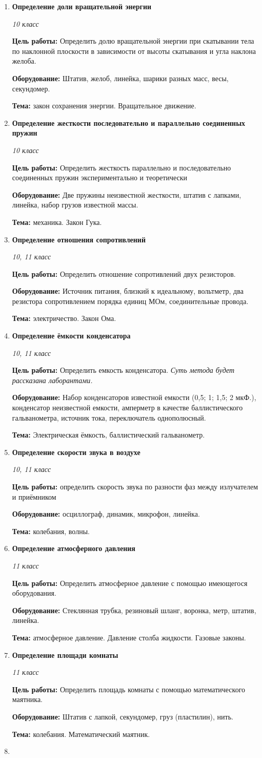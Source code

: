 \documentclass[a4paper,10pt]{article}
\newcommand{\labtitle}[5]{
	\textbf{#2}\par
	\textit{#1 класс}\par
	\textbf{Цель работы:} #3\par
	\textbf{Оборудование:} #4\par
	\textbf{Тема:} #5
}
\begin{document}
\begin{enumerate}
		{10}
		{Определение модуля Юнга}
		{Определить модуль Юнга резинового жгута при деформации растяжения.}
		{Резиновый жгут, миллиметровая бумага, линейка, набор грузов известной массы, штатив.}
		{закон Гука. Модуль Юнга.}
	\item \labtitle
		{10}
		{Определение доли вращательной энергии}
		{Определить долю вращательной энергии при скатывании тела по наклонной плоскости в зависимости от высоты скатывания и угла наклона желоба.}
		{Штатив, желоб, линейка, шарики разных масс, весы, секундомер.}
		{закон сохранения энергии. Вращательное движение.}
	\item \labtitle
		{10}
		{Определение жесткости последовательно и параллельно соединенных пружин}
		{Определить жесткость параллельно и последовательно соединенных пружин экспериментально и теоретически}
		{Две пружины неизвестной жесткости, штатив с лапками, линейка, набор грузов известной массы.}
		{механика. Закон Гука.}
	\item \labtitle
		{10, 11}
		{Определение отношения сопротивлений}
		{Определить отношение сопротивлений двух резисторов.}
		{Источник питания, близкий к идеальному, вольтметр, два резистора сопротивлением порядка единиц МОм, соединительные провода.}
		{электричество. Закон Ома.}
	\item \labtitle
		{10, 11}
		{Определение ёмкости конденсатора}
		{Определить емкость конденсатора. \textit{Суть метода будет рассказана лаборантами.}}
		{Набор конденсаторов известной емкости (0,5; 1; 1,5; 2 мкФ.), конденсатор неизвестной емкости, амперметр в качестве баллистического гальванометра, источник тока, переключатель однополюсный.}
		{Электрическая ёмкость, баллистический гальванометр.}
	\item \labtitle
		{10, 11}
		{Определение скорости звука в воздухе}
		{определить скорость звука по разности фаз между излучателем и приёмником}
		{осциллограф, динамик, микрофон, линейка.}
		{колебания, волны.}
	\item \labtitle
		{11}
		{Определение атмосферного давления}
		{Определить атмосферное давление с помощью имеющегося оборудования.}
		{Стеклянная трубка, резиновый шланг, воронка, метр, штатив, линейка.}
		{атмосферное давление. Давление столба жидкости. Газовые законы.}
	\item \labtitle
		{11}
		{Определение площади комнаты}
		{Определить площадь комнаты с помощью математического маятника.}
		{Штатив с лапкой, секундомер, груз (пластилин), нить.}
		{колебания. Математический маятник.}
	\item \labtitle

\end{enumerate}
\end{document}
